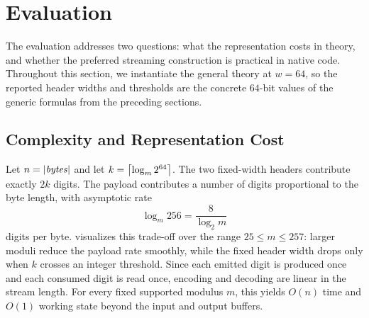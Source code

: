 \documentclass{system-security-article}
\newcommand{\BytesVar}{\mathit{bytes}}
\begin{document}
    \section{Evaluation}
    \label{sec:evaluation}

    The evaluation addresses two questions: what the representation costs in theory,
    and whether the preferred streaming construction is practical in native code.
    Throughout this section, we instantiate the general theory at \(w=64\), so the reported header widths and
    thresholds are the concrete \(64\)-bit values of the generic formulas from the preceding sections.

    \subsection{Complexity and Representation Cost}
    \label{subsec:expansion}

    Let \(n = \abs{\BytesVar}\) and let \(k = \left\lceil \log_m 2^{64} \right\rceil\).
    The two fixed-width headers contribute exactly \(2k\) digits.
    The payload contributes a number of digits proportional to the byte length, with asymptotic rate
    \[
        \log_m 256 = \frac{8}{\log_2 m}
    \]
    digits per byte.
     visualizes this trade-off over the range \(25 \le m \le 257\):
    larger moduli reduce the payload rate smoothly, while the fixed header width drops only when
    \(k\) crosses an integer threshold.
    Since each emitted digit is produced once and each consumed digit is read once, encoding
    and decoding are linear in the stream length.
    For every fixed supported modulus \(m\), this yields \(O(n)\) time and \(O(1)\) working state
    beyond the input and output buffers.
\end{document}
